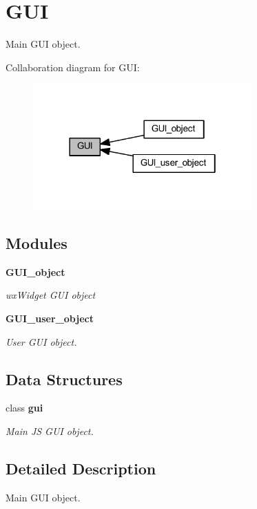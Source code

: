 \section{G\+UI}
\label{group___g_u_i}


Main G\+UI object.  


Collaboration diagram for G\+UI\+:\nopagebreak
\begin{figure}[H]
\begin{center}
\leavevmode
\includegraphics[width=238pt]{group___g_u_i}
\end{center}
\end{figure}
\subsection*{Modules}
\begin{DoxyCompactItemize}
\item 
\textbf{ G\+U\+I\+\_\+object}
\begin{DoxyCompactList}\small\item\em wx\+Widget G\+UI object \end{DoxyCompactList}\item 
\textbf{ G\+U\+I\+\_\+user\+\_\+object}
\begin{DoxyCompactList}\small\item\em User G\+UI object. \end{DoxyCompactList}\end{DoxyCompactItemize}
\subsection*{Data Structures}
\begin{DoxyCompactItemize}
\item 
class \textbf{ gui}
\begin{DoxyCompactList}\small\item\em Main JS G\+UI object. \end{DoxyCompactList}\end{DoxyCompactItemize}


\subsection{Detailed Description}
Main G\+UI object. 

